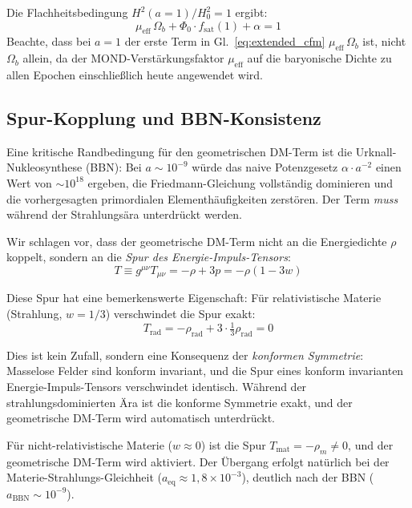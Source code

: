 \documentclass[aps,prd,twocolumn,superscriptaddress,nofootinbib]{revtex4-2}
\begin{document}
Die Flachheitsbedingung $H^2(a{=}1)/H_0^2 = 1$ ergibt:
\begin{equation}
\mu_{\mathrm{eff}}\,\Omega_b + \Phi_0 \cdot f_{\mathrm{sat}}(1) + \alpha = 1
\end{equation}
Beachte, dass bei $a=1$ der erste Term in Gl.~\eqref{eq:extended_cfm} $\mu_{\mathrm{eff}}\,\Omega_b$ ist, nicht $\Omega_b$ allein, da der MOND-Verst\"arkungsfaktor $\mu_{\mathrm{eff}}$ auf die baryonische Dichte zu allen Epochen einschlie\ss{}lich heute angewendet wird.

\subsection{Spur-Kopplung und BBN-Konsistenz}
\label{subsec:trace_coupling}

Eine kritische Randbedingung f\"ur den geometrischen DM-Term ist die Urknall-Nukleosynthese (BBN): Bei $a \sim 10^{-9}$ w\"urde das naive Potenzgesetz $\alpha \cdot a^{-2}$ einen Wert von $\sim 10^{18}$ ergeben, die Friedmann-Gleichung vollst\"andig dominieren und die vorhergesagten primordialen Elementh\"aufigkeiten zerst\"oren. Der Term \textit{muss} w\"ahrend der Strahlungs\"ara unterdr\"uckt werden.

Wir schlagen vor, dass der geometrische DM-Term nicht an die Energiedichte $\rho$ koppelt, sondern an die \textit{Spur des Energie-Impuls-Tensors}:
\begin{equation}
T \equiv g^{\mu\nu} T_{\mu\nu} = -\rho + 3p = -\rho(1 - 3w)
\end{equation}

Diese Spur hat eine bemerkenswerte Eigenschaft: F\"ur relativistische Materie (Strahlung, $w = 1/3$) verschwindet die Spur exakt:
\begin{equation}
T_{\mathrm{rad}} = -\rho_{\mathrm{rad}} + 3 \cdot \tfrac{1}{3}\rho_{\mathrm{rad}} = 0
\end{equation}

Dies ist kein Zufall, sondern eine Konsequenz der \textit{konformen Symmetrie}: Masselose Felder sind konform invariant, und die Spur eines konform invarianten Energie-Impuls-Tensors verschwindet identisch. W\"ahrend der strahlungsdominierten \"Ara ist die konforme Symmetrie exakt, und der geometrische DM-Term wird automatisch unterdr\"uckt.

F\"ur nicht-relativistische Materie ($w \approx 0$) ist die Spur $T_{\mathrm{mat}} = -\rho_m \neq 0$, und der geometrische DM-Term wird aktiviert. Der \"Ubergang erfolgt nat\"urlich bei der Materie-Strahlungs-Gleichheit ($a_{\mathrm{eq}} \approx 1{,}8 \times 10^{-3}$), deutlich nach der BBN ($a_{\mathrm{BBN}} \sim 10^{-9}$).
\end{document}
